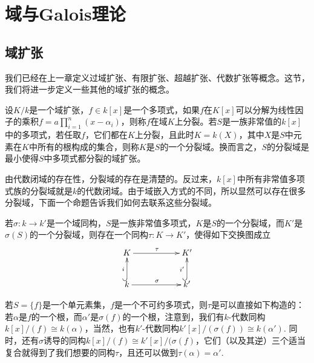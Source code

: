 \chapter{域与Galois理论}

\section{域扩张}

我们已经在上一章定义过域扩张、有限扩张、超越扩张、代数扩张等概念。这节，我们将进一步定义一些其他的域扩张的概念。

\begin{para}[分裂域]
    设$K/k$是一个域扩张，$f\in k[x]$是一个多项式，如果$f$在$K[x]$可以分解为线性因子的乘积$f=a\prod_{i=1}^n (x-\alpha_i)$，则称$f$在域$K$上分裂。若$S$是一族非常值的$k[x]$中的多项式，若任取$f$，它们都在$K$上分裂，且此时$K=k(X)$，其中$X$是$S$中元素在$K$中所有的根构成的集合，则称$K$是$S$的一个分裂域。换而言之，$S$的分裂域是最小使得$S$中多项式都分裂的域扩张。
\end{para}

由代数闭域的存在性，分裂域的存在是清楚的。反过来，$k[x]$中所有非常值多项式族的分裂域就是$k$的代数闭域。由于域嵌入方式的不同，所以显然可以存在很多分裂域，下面一个命题告诉我们如何去联系这些分裂域。

\begin{pro}
    若$\sigma:k\to k'$是一个域同构，$S$是一族非常值多项式，$K$是$S$的一个分裂域，而$K'$是$\sigma(S)$的一个分裂域，则存在一个同构$\tau:K\to K'$，使得如下交换图成立
    \[
        \xymatrix{
        K \ar@{->}[rr]^{\tau} &  & K' \\
        k \ar@{^{(}->}[u]^i \ar@{->}[rr]^{\sigma} &  & k' \ar@{^{(}->}[u]^{i'}
        }
    \]
\end{pro}

若$S=\{f\}$是一个单元素集，$f$是一个不可约多项式，则$\tau$是可以直接如下构造的：若$\alpha$是$f$的一个根，而$\alpha'$是$\sigma(f)$的一个根，注意到，我们有$k$-代数同构$k[x]/(f)\cong k(\alpha)$，当然，也有$k'$-代数同构$k'[x]/(\sigma(f))\cong k(\alpha')$. 同时，还有$\sigma$诱导的同构$k[x]/(f)\cong k'[x]/(\sigma(f)$，它们（以及其逆）三个适当复合就得到了我们想要的同构$\tau$，且还可以做到$\tau(\alpha)=\alpha'$.

